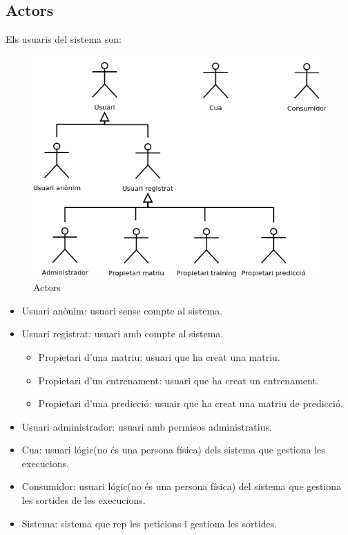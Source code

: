 \subsection{Actors}
Els usuaris del sistema son:
\begin{figure}[h]
  \centering
  \includegraphics[scale=0.5]{img/specification/Actors.png}
  \caption{Actors}
  \label{specification:actors}
\end{figure}
\begin{itemize}
\item Usuari an\`{o}nim: usuari sense compte al sistema.
\item Usuari registrat: usuari amb compte al sistema.
\begin{itemize}
\item Propietari d'una matriu: usuari que ha creat una matriu.
\item Propietari d'un entrenament: usuari que ha creat un entrenament.
\item Propietari d'una predicci\'{o}: usuair que ha creat una matriu de predicci\'{o}.
\end{itemize}
\item Usuari administrador: usuari amb permisos administratius.
\item Cua: usuari l\'{o}gic(no \'{e}s una persona f\'{i}sica) dels sistema que gestiona les execucions.
\item Consumidor: usuari l\'{o}gic(no \'{e}s una persona f\'{i}sica) del sistema que gestiona les sortides de les execucions.
\item Sistema: sistema que rep les peticions i gestiona les sortides.
\end{itemize}
